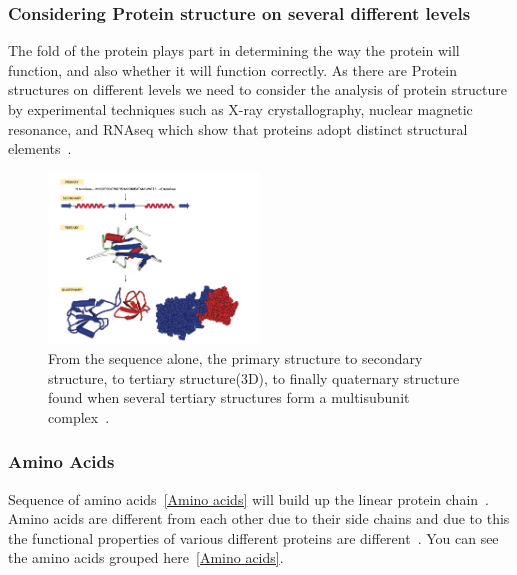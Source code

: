 \documentclass[]{final_report}
\begin{document}
\subsubsection{Considering Protein structure on several different levels}

The fold of the protein plays part in determining the way the protein will function, and also whether it will function correctly. As there are Protein structures on different levels we need to consider the analysis of protein structure by experimental techniques such as X-ray crystallography, nuclear magnetic resonance, and RNAseq which show that proteins adopt distinct structural elements~\cite{zvelebil_understanding_2008}.
\vspace{80px}


 
\begin{figure}[h]
    \centering
    \includegraphics[width=0.5\textwidth]{Protein Structure.png}
    \caption{\label{fig:levels of protein structure.}From the sequence alone, the primary structure to secondary structure, to tertiary structure(3D), to finally quaternary structure found when several tertiary structures form a multisubunit complex~\cite{zvelebil_understanding_2008}.}
\end{figure}
\clearpage

\subsubsection{Amino Acids}

Sequence of amino acids~\ref{Amino acids} will build up the linear protein chain~\cite{zvelebil_understanding_2008}. Amino acids are different from each other due to their side chains and due to this the functional properties of various different proteins are different~\cite{zvelebil_understanding_2008}. You can see the amino acids grouped here~\ref{Amino acids}.
\vspace{80px}
\end{document}
